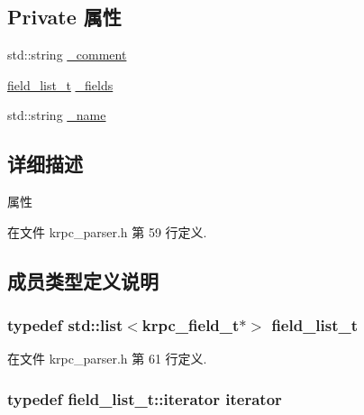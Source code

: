 \subsection*{Private 属性}
\begin{DoxyCompactItemize}
\item 
std\+::string \hyperlink{classkrpc__attribute__t_a8023a5250068c80d006205154d89046f}{\+\_\+comment}
\item 
\hyperlink{classkrpc__attribute__t_aab478ed2210945e7fc8ee29166274391}{field\+\_\+list\+\_\+t} \hyperlink{classkrpc__attribute__t_a062184377b756132b4cbfb218bf2f67b}{\+\_\+fields}
\item 
std\+::string \hyperlink{classkrpc__attribute__t_aaf2ed934b37cbbd236fdd1b01a5f5005}{\+\_\+name}
\end{DoxyCompactItemize}


\subsection{详细描述}
属性 

在文件 krpc\+\_\+parser.\+h 第 59 行定义.



\subsection{成员类型定义说明}
\hypertarget{classkrpc__attribute__t_aab478ed2210945e7fc8ee29166274391}{}
\subsubsection[{field\+\_\+list\+\_\+t}]{\setlength{\rightskip}{0pt plus 5cm}typedef std\+::list$<${\bf krpc\+\_\+field\+\_\+t}$\ast$$>$ {\bf field\+\_\+list\+\_\+t}}\label{classkrpc__attribute__t_aab478ed2210945e7fc8ee29166274391}


在文件 krpc\+\_\+parser.\+h 第 61 行定义.

\hypertarget{classkrpc__attribute__t_a7280da1ff086baffe284878d3e955495}{}
\subsubsection[{iterator}]{\setlength{\rightskip}{0pt plus 5cm}typedef field\+\_\+list\+\_\+t\+::iterator {\bf iterator}}\label{classkrpc__attribute__t_a7280da1ff086baffe284878d3e955495}


